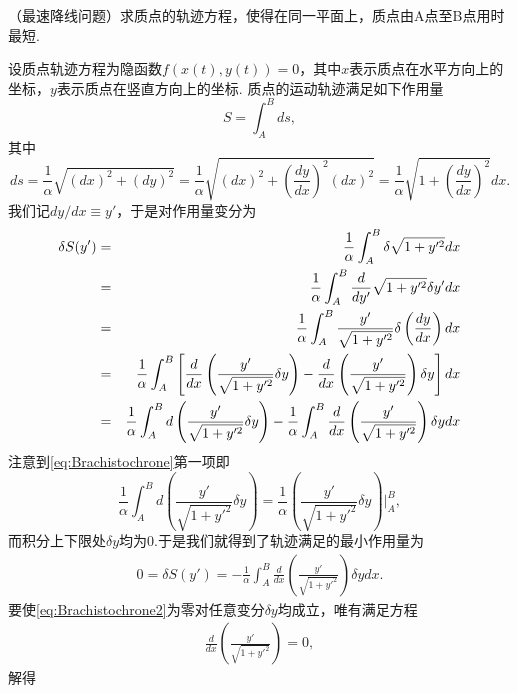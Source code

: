 \begin{example}
    （最速降线问题）求质点的轨迹方程，使得在同一平面上，质点由A点至B点用时最短.

    设质点轨迹方程为隐函数$f(x(t),y(t))=0$，其中$x$表示质点在水平方向上的坐标，$y$表示质点在竖直方向上的坐标.
    质点的运动轨迹满足如下作用量
    $$S=\int^B_A ds,$$
    其中
    $$ds=\frac{1}{\alpha}\sqrt{(dx)^2+(dy)^2}=\frac{1}{\alpha}\sqrt{(dx)^2+\left(\frac{dy}{dx}\right)^2(dx)^2}=\frac{1}{\alpha}\sqrt{1+\left(\frac{dy}{dx}\right)^2}dx.$$
    我们记$dy/dx\equiv y'$，于是对作用量变分为
    \begin{eqnarray}\label{eq:Brachistochrone}
        \delta S(y')&=&\frac{1}{\alpha}\int^B_A \delta\sqrt{1+y'^2}dx\notag\\
        &=&\frac{1}{\alpha}\int^B_A \frac{d}{dy'}\sqrt{1+y'^2}\delta y'dx\notag\\
        &=&\frac{1}{\alpha}\int^B_A \frac{y'}{\sqrt{1+y'^2}}\delta \left(\frac{dy}{dx}\right)dx\notag\\
        &=&\frac{1}{\alpha}\int^B_A \left[\frac{d}{dx}\left(\frac{y'}{\sqrt{1+y'^2}}\delta y\right)-\frac{d}{dx}\left(\frac{y'}{\sqrt{1+y'^2}}\right)\delta y\right]dx\notag\\
        &=&\frac{1}{\alpha}\int^B_A d\left(\frac{y'}{\sqrt{1+y'^2}}\delta y\right)-\frac{1}{\alpha}\int^B_A\frac{d}{dx}\left(\frac{y'}{\sqrt{1+y'^2}}\right)\delta ydx
    \end{eqnarray}
    注意到\ref{eq:Brachistochrone}第一项即
    $$\frac{1}{\alpha}\int^B_A d\left(\frac{y'}{\sqrt{1+y'^2}}\delta y\right)=\frac{1}{\alpha}\left(\frac{y'}{\sqrt{1+y'^2}}\delta y\right)\Bigg|^B_A,$$
    而积分上下限处$\delta y$均为0.于是我们就得到了轨迹满足的最小作用量为
    \begin{eqnarray}\label{eq:Brachistochrone2}
        0=\delta S(y')=-\frac{1}{\alpha}\int^B_A\frac{d}{dx}\left(\frac{y'}{\sqrt{1+y'^2}}\right)\delta ydx.
    \end{eqnarray}
    要使\ref{eq:Brachistochrone2}为零对任意变分$\delta y$均成立，唯有满足方程
    \begin{eqnarray}\label{eq:elBrachistochrone}
        \frac{d}{dx}\left(\frac{y'}{\sqrt{1+y'^2}}	\right)=0,
    \end{eqnarray}
    解得
\end{example}
